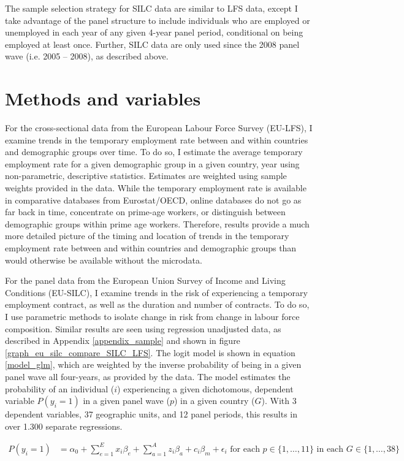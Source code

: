 \documentclass[12pt]{article}
\begin{document}
The sample selection strategy for SILC data are similar to LFS data, except I take advantage of the panel structure to include individuals who are employed or unemployed in each year of any given 4-year panel period, conditional on being employed at least once.  Further, SILC data are only used since the 2008 panel wave (i.e. 2005 -- 2008), as described above.

\section{Methods and variables}

For the cross-sectional data from the European Labour Force Survey (EU-LFS), I examine trends in the temporary employment rate between and within countries and demographic groups over time.  To do so, I estimate the average temporary employment rate for a given demographic group in a given country, year using non-parametric, descriptive statistics.  Estimates are weighted using sample weights provided in the data.  While the temporary employment rate is available in comparative databases from Eurostat/OECD, online databases do not go as far back in time, concentrate on prime-age workers, or distinguish between demographic groups within prime age workers.  Therefore, results provide a much more detailed picture of the timing and location of trends in the temporary employment rate between and within countries and demographic groups than would otherwise be available without the microdata.

For the panel data from the European Union Survey of Income and Living Conditions (EU-SILC), I examine trends in the risk of experiencing a temporary employment contract, as well as the duration and number of contracts.  To do so, I use parametric methods to isolate change in risk from change in labour force composition.  Similar results are seen using regression unadjusted data, as described in Appendix \ref{appendix_sample} and shown in figure \ref{graph_eu_silc_compare_SILC_LFS}.  The logit model is shown in equation \ref{model_glm}, which are weighted by the inverse probability of being in a given panel wave all four-years, as provided by the data.  The model estimates the probability of an individual ($i$) experiencing a given dichotomous, dependent variable $P(y_i=1)$ in a given panel wave ($p$) in a given country ($G$).  With 3 dependent variables, 37 geographic units, and 12 panel periods, this results in over 1.300 separate regressions.  

\footnotesize
\begin{align}
	P(y_i = 1) & = \alpha_0 + \sum_{e=1}^{E} x_i\beta_{e} + \sum_{a=1}^{A} z_i\beta_{a}  + c_i\beta_{m} + \epsilon_i \text{ for each } p \in \{ 1, \dots, 11 \} \text{ in each } G \in \{ 1, \dots, 38 \} 
\label{model_glm}
\end{align}
\normalsize
\end{document}
